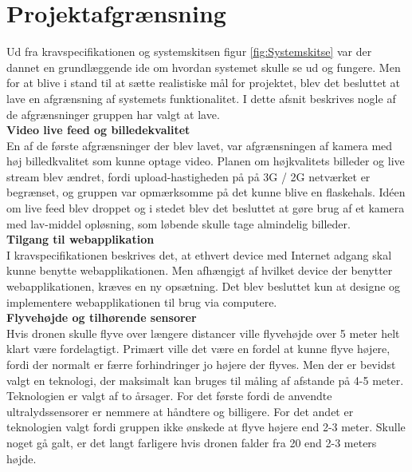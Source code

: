 \chapter{Projektafgrænsning}



Ud fra kravspecifikationen og systemskitsen figur \ref{fig:Systemskitse} var der dannet en grundlæggende ide om hvordan systemet skulle se ud og fungere. Men for at blive i stand til at sætte realistiske mål for projektet, blev det besluttet at lave en afgrænsning af systemets funktionalitet. I dette afsnit beskrives nogle af de afgrænsninger gruppen har valgt at lave. \\


\textbf{Video live feed og billedekvalitet}\\
En af de første afgrænsninger der blev lavet, var afgrænsningen af kamera med høj billedkvalitet som kunne optage video. Planen om højkvalitets billeder og live stream blev ændret, fordi upload-hastigheden på på 3G / 2G netværket er begrænset, og gruppen var opmærksomme på det kunne blive en flaskehals. Idéen om live feed blev droppet og i stedet blev det besluttet at gøre brug af et kamera med lav-middel opløsning, som løbende skulle tage almindelig billeder.\\

\textbf{Tilgang til webapplikation}\\
I kravspecifikationen beskrives det, at ethvert device med Internet adgang skal kunne benytte webapplikationen. Men afhængigt af hvilket device der benytter webapplikationen, kræves en ny opsætning. Det blev besluttet kun at designe og implementere webapplikationen til brug via computere.\\

\textbf{Flyvehøjde og tilhørende sensorer}\\
Hvis dronen skulle flyve over længere distancer ville flyvehøjde over 5 meter helt klart være fordelagtigt. Primært ville det være en fordel at kunne flyve højere, fordi der normalt er færre forhindringer jo højere der flyves. Men der er bevidst valgt en teknologi, der maksimalt kan bruges til måling af afstande på 4-5 meter. Teknologien er valgt af to årsager. For det første fordi de anvendte ultralydssensorer er nemmere at håndtere og billigere. For det andet er teknologien valgt fordi gruppen ikke ønskede at flyve højere end 2-3 meter. Skulle noget gå galt, er det langt farligere hvis dronen falder fra 20 end 2-3 meters højde.  
